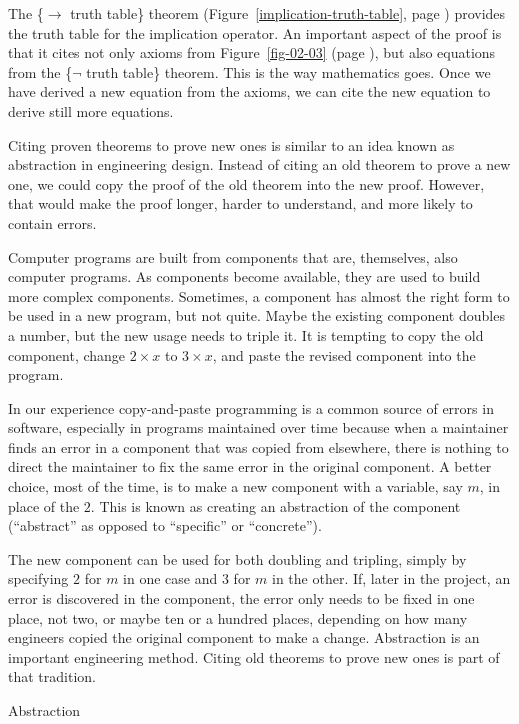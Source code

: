 The \{$\rightarrow$ truth table\} theorem
(Figure~\ref{implication-truth-table}, page \pageref{implication-truth-table})
provides the truth table
for the implication operator.
An important aspect of the proof is that it cites
not only axioms from Figure~\ref{fig-02-03} (page \pageref{fig-02-03}),
but also equations from the \{$\neg$ truth table\} theorem.
This is the way mathematics goes. Once we have derived
a new equation from the axioms, we can cite
the new equation to derive still more equations.

\begin{aside}
Citing proven theorems to prove new ones
is similar to an idea known as
abstraction
in engineering design.
Instead of citing an old theorem to prove a new one,
we could copy the proof of the old theorem into the new proof.
However, that would make the proof longer, harder to understand,
and more likely to contain errors.

Computer programs are built from components that are, themselves,
also computer programs. As components become available,
they are used to build more complex components.
Sometimes, a component has almost the right form
to be used in a new program, but not quite.
Maybe the existing component doubles a number,
but the new usage needs to triple it.
It is tempting to copy the
old component, change $2 \times x$ to $3 \times x$,
and paste the revised component into the program.

In our experience
copy-and-paste programming is
a common source of errors in software,
especially in programs maintained
over time because when a maintainer finds an error in
a component that was copied from elsewhere,
there is nothing to direct the maintainer to fix
the same error in the original component.
A better choice, most of the time,
is to make a new component with
a variable, say $m$, in place of the $2$.
This is known as creating an abstraction of the component
(``abstract'' as opposed to ``specific'' or ``concrete'').

The new component can be used for both doubling and tripling,
simply by specifying $2$ for $m$ in one case and $3$ for $m$ in the other.
If, later in the project, an error is discovered in the component,
the error only needs to be fixed in one place, not two,
or maybe ten or a hundred places, depending on how many engineers
copied the original component to make a change.
Abstraction is an important engineering method.
Citing old theorems to prove new ones
is part of that tradition.
\caption{Abstraction}
\label{abstraction}
\end{aside}

